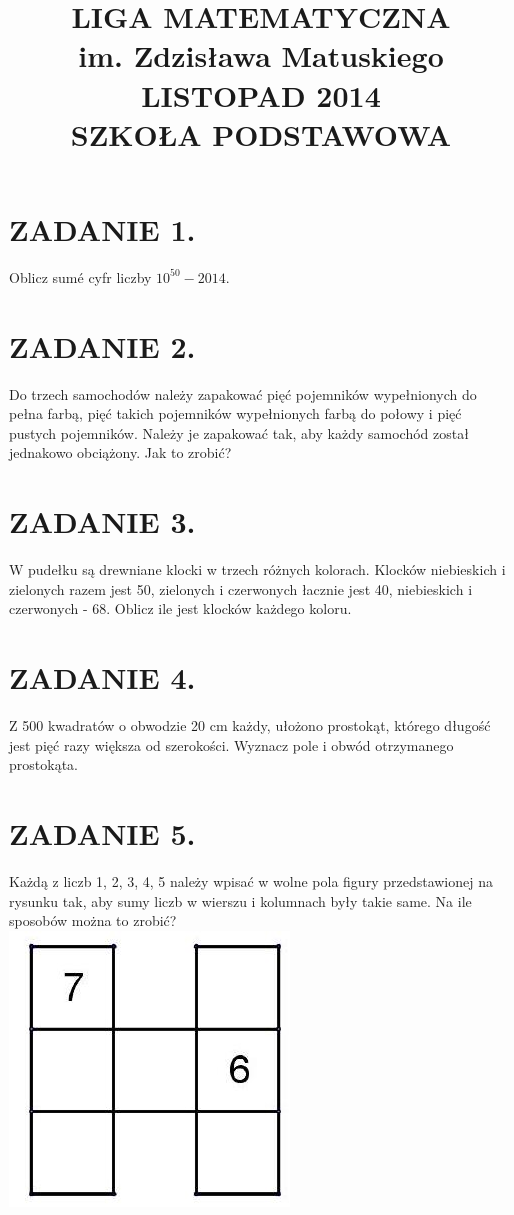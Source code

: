 \documentclass[10pt]{article}
\title{LIGA MATEMATYCZNA \\
 im. Zdzisława Matuskiego \\
 LISTOPAD 2014 \\
 SZKOŁA PODSTAWOWA }
\author{}
\date{}
\begin{document}
\maketitle
\section*{ZADANIE 1.}
Oblicz sumé cyfr liczby \(10^{50}-2014\).

\section*{ZADANIE 2.}
Do trzech samochodów należy zapakować pięć pojemników wypełnionych do pełna farbą, pięć takich pojemników wypełnionych farbą do połowy i pięć pustych pojemników. Należy je zapakować tak, aby każdy samochód został jednakowo obciążony. Jak to zrobić?

\section*{ZADANIE 3.}
W pudełku są drewniane klocki w trzech różnych kolorach. Klocków niebieskich i zielonych razem jest 50, zielonych i czerwonych łacznie jest 40, niebieskich i czerwonych - 68. Oblicz ile jest klocków każdego koloru.

\section*{ZADANIE 4.}
Z 500 kwadratów o obwodzie 20 cm każdy, ułożono prostokąt, którego długość jest pięć razy większa od szerokości. Wyznacz pole i obwód otrzymanego prostokąta.

\section*{ZADANIE 5.}
Każdą z liczb 1, 2, 3, 4, 5 należy wpisać w wolne pola figury przedstawionej na rysunku tak, aby sumy liczb w wierszu i kolumnach były takie same. Na ile sposobów można to zrobić?\\
\includegraphics[max width=\textwidth, center]{2024_11_21_406b3b78e649b3e15709g-1}
\end{document}
